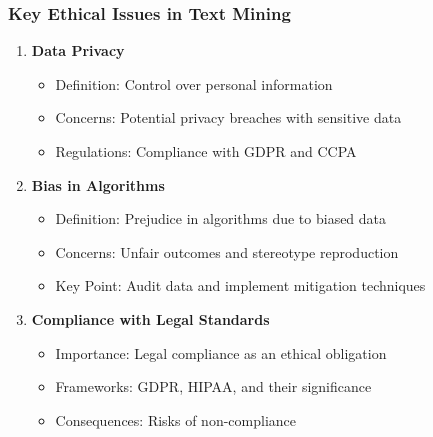 \documentclass[aspectratio=169]{beamer}
\begin{document}
\begin{frame}[fragile]
    \frametitle{Key Ethical Issues in Text Mining}

    \begin{enumerate}
        \item \textbf{Data Privacy}
            \begin{itemize}
                \item Definition: Control over personal information
                \item Concerns: Potential privacy breaches with sensitive data
                \item Regulations: Compliance with GDPR and CCPA
            \end{itemize}
        \item \textbf{Bias in Algorithms}
            \begin{itemize}
                \item Definition: Prejudice in algorithms due to biased data
                \item Concerns: Unfair outcomes and stereotype reproduction
                \item Key Point: Audit data and implement mitigation techniques
            \end{itemize}
        \item \textbf{Compliance with Legal Standards}
            \begin{itemize}
                \item Importance: Legal compliance as an ethical obligation
                \item Frameworks: GDPR, HIPAA, and their significance
                \item Consequences: Risks of non-compliance
            \end{itemize}
    \end{enumerate}
\end{frame}
\end{document}
